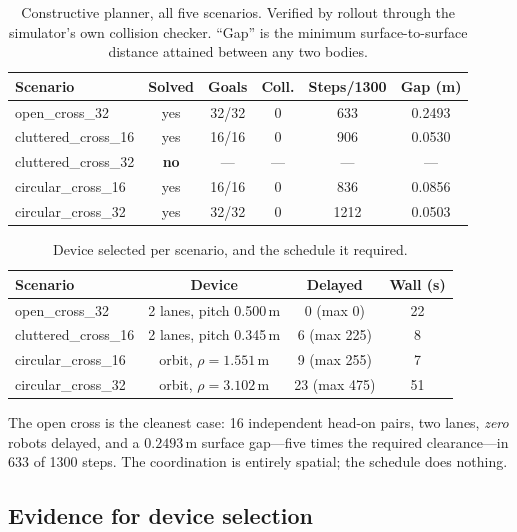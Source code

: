 \documentclass[conference]{IEEEtran}
\begin{document}
\begin{table}[t]
\caption{Constructive planner, all five scenarios. Verified by rollout through the
simulator's own collision checker. ``Gap'' is the minimum surface-to-surface distance
attained between any two bodies.}
\label{tab:main}
\centering
\small
\begin{tabular}{@{}lccccc@{}}
\toprule
Scenario & Solved & Goals & Coll. & Steps/1300 & Gap (m) \\
\midrule
open\_cross\_32      & yes & 32/32 & 0 & 633  & 0.2493 \\
cluttered\_cross\_16 & yes & 16/16 & 0 & 906  & 0.0530 \\
cluttered\_cross\_32 & \textbf{no} & --- & --- & --- & --- \\
circular\_cross\_16  & yes & 16/16 & 0 & 836  & 0.0856 \\
circular\_cross\_32  & yes & 32/32 & 0 & 1212 & 0.0503 \\
\bottomrule
\end{tabular}
\end{table}

\begin{table}[t]
\caption{Device selected per scenario, and the schedule it required.}
\label{tab:device}
\centering
\small
\begin{tabular}{@{}lccc@{}}
\toprule
Scenario & Device & Delayed & Wall (s) \\
\midrule
open\_cross\_32      & 2 lanes, pitch 0.500\,m & 0 (max 0)   & 22 \\
cluttered\_cross\_16 & 2 lanes, pitch 0.345\,m & 6 (max 225) & 8 \\
circular\_cross\_16  & orbit, $\rho=1.551$\,m  & 9 (max 255) & 7 \\
circular\_cross\_32  & orbit, $\rho=3.102$\,m  & 23 (max 475)& 51 \\
\bottomrule
\end{tabular}
\end{table}

The open cross is the cleanest case: 16 independent head-on pairs, two lanes, \emph{zero}
robots delayed, and a $0.2493$\,m surface gap---five times the required clearance---in 633
of 1300 steps. The coordination is entirely spatial; the schedule does nothing.

\subsection{Evidence for device selection}
\label{sec:res-device}
\end{document}
